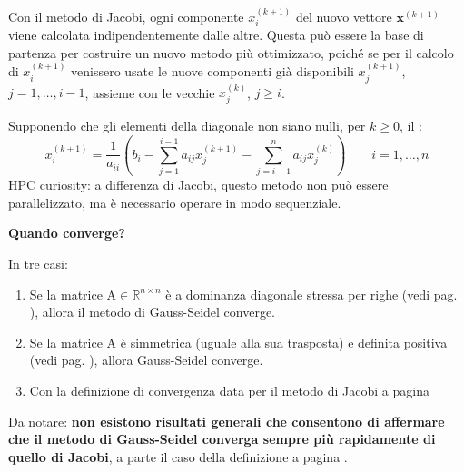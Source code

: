 Con il metodo di Jacobi, ogni componente $x_{i}^{\left(k+1\right)}$ del nuovo vettore $\mathbf{x}^{\left(k+1\right)}$ viene calcolata indipendentemente dalle altre. Questa può essere la base di partenza per costruire un nuovo metodo più ottimizzato, poiché se per il calcolo di $x_{i}^{\left(k+1\right)}$ venissero usate le nuove componenti già disponibili $x_{j}^{\left(k+1\right)}$, $j = 1, \dots, i-1$, assieme con le vecchie $x_{j}^{\left(k\right)}$, $j \ge i$.

\highspace
Supponendo che gli elementi della diagonale non siano nulli, per $k \ge 0$, il :
\begin{equation}\label{eq: metodo di Gauss-Seidel}
    x_{i}^{\left(k+1\right)} = 
    \dfrac{1}{a_{ii}} \left(
        b_{i} -
        \displaystyle\sum_{j=1}^{i-1} a_{ij}x_{j}^{\left(k+1\right)} -
        \displaystyle\sum_{j=i+1}^{n} a_{ij}x_{j}^{\left(k\right)}
    \right)
    \hspace{2em}
    i = 1, \dots, n
\end{equation}
HPC curiosity: a differenza di Jacobi, questo metodo non può essere parallelizzato, ma è necessario operare in modo sequenziale.

\begin{flushleft}
    \textcolor{Green3}{ \textbf{Quando converge?}}
\end{flushleft}
In tre casi:
\begin{enumerate}
    \item Se la matrice $\mathrm{A} \in \mathbb{R}^{n \times n}$ è a dominanza diagonale stressa per righe (vedi pag. \pageref{dominanza diagonale stressa per righe}), allora il metodo di Gauss-Seidel converge.

    \item Se la matrice $\mathrm{A}$ è simmetrica (uguale alla sua trasposta) e definita positiva (vedi pag. \pageref{matrice definita positiva}), allora Gauss-Seidel converge.

    \item Con la definizione di convergenza data per il metodo di Jacobi a pagina \pageref{definizione: convergenza di Jacobi e Gauss-Seidel}
\end{enumerate}
Da notare: \textbf{non esistono risultati generali che consentono di affermare che il metodo di Gauss-Seidel converga sempre più rapidamente di quello di Jacobi}, a parte il caso della definizione a pagina \pageref{matrice definita positiva}.
